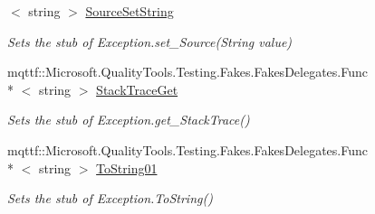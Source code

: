 \begin{DoxyCompactItemize}
$<$ string $>$ \hyperlink{class_system_1_1_component_model_1_1_fakes_1_1_stub_invalid_enum_argument_exception_a84b1469eb5300b91ac6978d912c29cfd}{Source\-Set\-String}
\begin{DoxyCompactList}\small\item\em Sets the stub of Exception.\-set\-\_\-\-Source(\-String value)\end{DoxyCompactList}\item 
mqttf\-::\-Microsoft.\-Quality\-Tools.\-Testing.\-Fakes.\-Fakes\-Delegates.\-Func\\*
$<$ string $>$ \hyperlink{class_system_1_1_component_model_1_1_fakes_1_1_stub_invalid_enum_argument_exception_ad6d5fc863ef5097db20fabf801ac1840}{Stack\-Trace\-Get}
\begin{DoxyCompactList}\small\item\em Sets the stub of Exception.\-get\-\_\-\-Stack\-Trace()\end{DoxyCompactList}\item 
mqttf\-::\-Microsoft.\-Quality\-Tools.\-Testing.\-Fakes.\-Fakes\-Delegates.\-Func\\*
$<$ string $>$ \hyperlink{class_system_1_1_component_model_1_1_fakes_1_1_stub_invalid_enum_argument_exception_acd972f0b131cf5b9b9eb5f5c77f327d0}{To\-String01}
\begin{DoxyCompactList}\small\item\em Sets the stub of Exception.\-To\-String()\end{DoxyCompactList}\end{DoxyCompactItemize}
